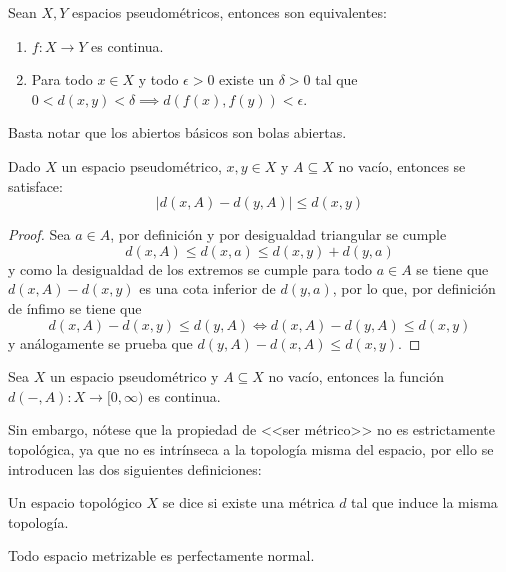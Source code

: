 \documentclass[topologia-analisis.tex]{subfiles}
\begin{document}
\begin{thmi}
	Sean $X, Y$ espacios pseudométricos, entonces son equivalentes:
	\begin{enumerate}
		\item $f \colon X \to Y$ es continua.
		\item Para todo $x \in X$ y todo $\epsilon > 0$ existe un $\delta > 0$ tal que $0 < d(x, y) < \delta \implies d( f(x), f(y) ) < \epsilon$.
	\end{enumerate}
\end{thmi}
\begin{hint}
	Basta notar que los abiertos básicos son bolas abiertas.
\end{hint}

\begin{lem}
	Dado $X$ un espacio pseudométrico, $x,y\in X$ y $A \subseteq X$ no vacío, entonces se satisface:
	$$ | d(x, A) - d(y, A) | \le d(x, y) $$
\end{lem}
\begin{proof}
	Sea $a \in A$, por definición y por desigualdad triangular se cumple
	$$ d(x, A) \le d(x, a) \le d(x, y) + d(y, a) $$
	y como la desigualdad de los extremos se cumple para todo $a\in A$ se tiene que $d(x, A) - d(x, y)$ es una cota inferior de $d(y, a)$, por lo que,
	por definición de ínfimo se tiene que
	$$ d(x, A) - d(x, y) \le d(y, A) \iff d(x, A) - d(y, A) \le d(x, y) $$
	y análogamente se prueba que $d(y, A) - d(x, A) \le d(x, y)$.
\end{proof}
\begin{thm}
	Sea $X$ un espacio pseudométrico y $A \subseteq X$ no vacío, entonces la función $d(-, A) \colon X \to [0, \infty)$ es continua.
\end{thm}

Sin embargo, nótese que la propiedad de <<ser métrico>> no es estrictamente topológica, ya que no es intrínseca a la topología misma del espacio,
por ello se introducen las dos siguientes definiciones:
\begin{mydefi}
	Un espacio topológico $X$ se dice  si existe una métrica $d$ tal que induce la misma topología.
\end{mydefi}

\begin{thm}
	Todo espacio metrizable es perfectamente normal.
\end{thm}
\end{document}
